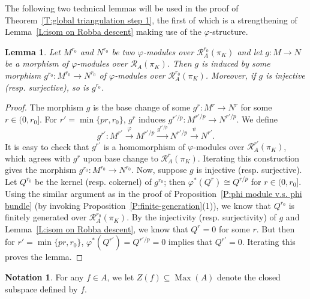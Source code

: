 \documentclass[12pt]{article}
\newtheorem{lemma}[theorem]{Lemma}
\theoremstyle{definition}
\newtheorem{notation}[theorem]{Notation}
\numberwithin{equation}{theorem}
\newcommand{\calR}{\mathcal{R}}
\DeclareMathOperator{\Max}{Max}
\begin{document}
The following two technical lemmas will be used in the proof of Theorem~\ref{T:global triangulation step 1}, the first of which is a strengthening of Lemma~\ref{L:isom on Robba descent} making use of the $\varphi$-structure.

\begin{lemma}
\label{L:extending isom and surj}
Let $M^{r_0}$ and $N^{r_0}$ be two  $\varphi$-modules over $\calR_A^{r_0}(\pi_K)$ and let $g: M \to N$ be a morphism of  $\varphi$-modules over $\calR_A(\pi_K)$.  Then $g$ is induced by some morphism $g^{r_0}:M^{r_0} \to N^{r_0}$ of  $\varphi$-modules over $\calR_A^{r_0}(\pi_K)$. Moreover, if $g$ is injective (resp. surjective), so is $g^{r_0}$.
\end{lemma}
\begin{proof}
The morphism $g$ is the base change of some $g^r: M^r \to N^r$ for some $r \in (0, r_0]$. For $r' = \min\{pr, r_0\}$, $g^r$ induces $g^{r'/p}: M^{r'/p} \to N^{r'/p}$. We define
\[
g^{r'}: M^{r'} \xrightarrow{\varphi} M^{r'/p} \xrightarrow{g^{r'/p}} N^{r'/p} \xrightarrow{\psi} N^{r'}.
\]
It is easy to check that $g^{r'}$ is a homomorphism of $\varphi$-modules over $\calR_A^{r'}(\pi_K)$, which agrees with $g^r$ upon base change to $\calR^r_A(\pi_K)$.
Iterating this construction gives the morphism $g^{r_0}:M^{r_0} \to N^{r_0}$.
Now, suppose $g$ is injective (resp. surjective).  Let $Q^{r_0}$ be the kernel (resp. cokernel) of $g^{r_0}$; then $\varphi^*(Q^r) \cong Q^{r/p}$ for $r \in (0, r_0]$.  Using the similar argument as in the proof of Proposition~\ref{P:phi module v.s. phi bundle} (by invoking Proposition~\ref{P:finite-generation}(1)), we know that $Q^{r_0}$ is finitely generated over $\calR^{r_0}_A(\pi_K)$.  By the injectivity (resp. surjectivity) of $g$ and Lemma~\ref{L:isom on Robba descent}, we know that $Q^r = 0$ for some $r$.  But then for $r' = \min\{pr, r_0\}$, $\varphi^*(Q^{r'}) = Q^{r'/p} = 0$ implies that $Q^{r'} =0$.  Iterating this proves the lemma.
\end{proof}

\begin{notation}
For any $f \in A$, we let $Z(f) \subseteq \Max(A)$ denote the closed subspace defined by $f$.
\end{notation}
\end{document}
